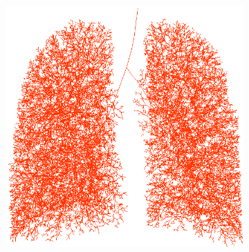 \begin{figure}[htbp]
\hspace{.1in} %
\begin{subfigure}{.425\linewidth}%
  \includegraphics[width=\linewidth,trim={{.0\wd0} {.0\wd0} {.0\wd0} {.0\wd0}},clip]{ModelBasedAnalysis/Image/IPF511_Normal_FE_Airway.png}

\end{subfigure}
\end{figure}
